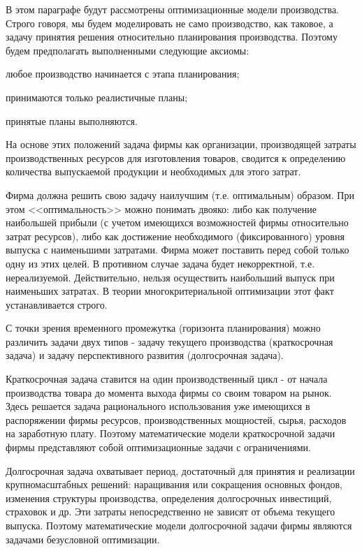 \documentclass[12pt, 4paper]{book}
\begin{document}
{В этом параграфе будут рассмотрены оптимизационные модели производства. Строго говоря, мы будем моделировать не само производство, как таковое, а задачу принятия решения относительно планирования производства. Поэтому будем предполагать выполненными следующие аксиомы: 
\par

любое производство начинается с этапа планирования;
\par
 
принимаются только реалистичные планы; 
\par

принятые планы выполняются. 
\par

На основе этих положений задача фирмы как организации, производящей затраты производственных ресурсов для изготовления товаров, сводится к определению количества выпускаемой продукции и необходимых для этого затрат. 
\par

Фирма должна решить свою задачу наилучшим (т.е. оптимальным) образом. При этом <<оптимальность>> можно понимать двояко: либо как получение наибольшей прибыли (с учетом имеющихся возможностей фирмы относительно затрат ресурсов), либо как достижение необходимого (фиксированного) уровня выпуска с наименьшими затратами. Фирма может поставить перед собой только одну из этих целей. В противном случае задача будет некорректной, т.е. нереализуемой. Действительно, нельзя осуществить наибольший выпуск при наименьших затратах. В теории многокритериальной оптимизации этот факт устанавливается строго. 
\par

С точки зрения временного промежутка (горизонта планирования) можно различить задачи двух типов - задачу текущего производства (краткосрочная задача) и задачу перспективного развития (долгосрочная задача). 
\par

Краткосрочная задача ставится на один производственный цикл - от начала производства товара до момента выхода фирмы со своим товаром на рынок. Здесь решается задача рационального использования уже имеющихся в распоряжении фирмы ресурсов, производственных мощностей, сырья, расходов на заработную плату. Поэтому математические модели краткосрочной задачи фирмы представляют собой оптимизационные задачи с ограничениями. 
\par

Долгосрочная задача охватывает период, достаточный для принятия и реализации крупномасштабных решений: наращивания или сокращения основных фондов, изменения структуры производства, определения долгосрочных инвестиций, страховок и др. Эти затраты непосредственно не зависят от объема текущего выпуска. Поэтому математические модели долгосрочной задачи фирмы являются задачами безусловной оптимизации. 
\par

}
\end{document}
